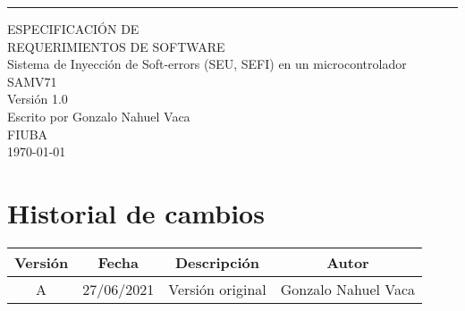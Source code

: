 \documentclass{scrreprt}
\date{26/06/2021}
\def\myversion{1.0 }
\begin{document}
\begin{flushright}
    \rule{16cm}{5pt}\vskip1cm
    \begin{bfseries}
        \Huge{ESPECIFICACIÓN DE\\ REQUERIMIENTOS DE SOFTWARE}\\
        \vspace{1.9cm}
        Sistema de Inyección de Soft-errors (SEU,
        SEFI) en un microcontrolador SAMV71
        \\
        \vspace{1.9cm}
        \LARGE{Versión \myversion}\\
        \vspace{1.9cm}
        Escrito por Gonzalo Nahuel Vaca\\
        \vspace{1.9cm}
        FIUBA\\
        \vspace{1.9cm}
        \today\\
    \end{bfseries}
\end{flushright}

\chapter*{Historial de cambios}

\begin{center}
    \begin{tabular}{|c|c|c|c|}
        \hline
	    Versión & Fecha & Descripción & Autor\\
        \hline
	    A & 27/06/2021 & Versión original & Gonzalo Nahuel Vaca\\
        \hline
    \end{tabular}
\end{center}

\tableofcontents








\end{document}
